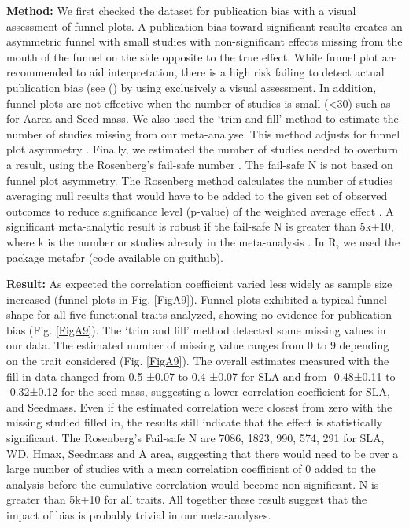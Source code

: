 \documentclass[a4paper]{article}\usepackage[]{graphicx}\usepackage[]{color}
\begin{document}
\begin{appendices}
\textbf{Method:} We first checked the dataset for publication bias with a visual assessment of funnel plots. A publication bias toward significant results creates an asymmetric funnel with small studies with non-significant effects missing from the mouth of the funnel on the side opposite to the true effect. While funnel plot are recommended to aid interpretation, there is a high risk failing to detect actual publication bias (see (\citealt{Koricheva:2013tz}) by using exclusively a visual assessment. In addition, funnel plots are not effective when the number of studies is small (<30) such as for Aarea and Seed mass. 
We also used the ‘trim and fill’ method to estimate the number of studies missing from our meta-analyse. This method adjusts for funnel plot asymmetry \citep{Duval:2000dg}. 
Finally, we estimated the number of studies needed to overturn a result, using the Rosenberg’s fail-safe number \citep{Rosenberg:2005hk}. The fail-safe N is not based on funnel plot asymmetry. The Rosenberg method calculates the number of studies averaging null results that would have to be added to the given set of observed outcomes to reduce significance level (p-value) of the weighted average effect \citep{Rosenberg:2005hk}. A significant meta-analytic result is robust if the fail-safe N is greater than 5k+10, where k is the number or studies already in the meta-analysis \citep{Rosenthal:1979do}.
In R, we used the package metafor (code available on guithub).

\textbf{Result:} As expected the correlation coefficient varied less widely as sample size increased (funnel plots in Fig. \ref{FigA9}). Funnel plots exhibited a typical funnel shape for all five functional traits analyzed, showing no evidence for publication bias (Fig. \ref{FigA9}). 
The ‘trim and fill’ method detected some missing values in our data. The estimated number of missing value ranges from 0 to 9 depending on the trait considered (Fig. \ref{FigA9}). The overall estimates measured with the fill in data changed from 0.5 ±0.07 to 0.4 ±0.07 for SLA and from -0.48±0.11 to -0.32±0.12 for the seed mass, suggesting a lower correlation coefficient for SLA, and Seedmass. Even if the estimated correlation were closest from zero with the missing studied filled in, the results still indicate that the effect is statistically significant.
The Rosenberg’s Fail-safe N are 7086, 1823, 990, 574, 291 for SLA, WD, Hmax, Seedmass and A area, suggesting that there would need to be over a large number of studies with a mean correlation coefficient of 0 added to the analysis before the cumulative correlation would become non significant. N is greater than 5k+10 for all traits.
All together these result suggest that the impact of bias is probably trivial in our meta-analyses. 


\end{appendices}
\end{document}
